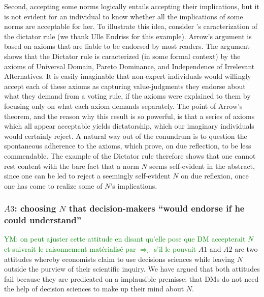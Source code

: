 \documentclass[preprint, french, english, 11pt, authoryear]{elsarticle}%
\newcommand{\protectforpdf}[1]{\texorpdfstring{\ensuremath{#1}}{#1}}
\newcommand{\commentYM}[1]{\textcolor{green}{YM: #1}}
\begin{document}
Second, accepting some norms logically entails accepting their implications, but it is not evident for an individual to know whether all the implications of some norms are acceptable for her. To illustrate this idea, consider \citeauthor{arrow_social_2012}’s \citeyearpar{arrow_social_2012} caracterization of the dictator rule (we thank Ulle Endriss for this example). Arrow's argument is based on axioms that are liable to be endorsed by most readers. The argument shows that the Dictator rule is caracterized (in some formal context) by the axioms of Universal Domain, Pareto Dominance, and Independence of Irrelevant Alternatives. It is easily imaginable that non-expert individuals would willingly accept each of these axioms as capturing value-judgments they endorse about what they demand from a voting rule, if the axioms were explained to them by focusing only on what each axiom demands separately. The point of Arrow's theorem, and the reason why this result is so powerful, is that a series of axioms which all appear acceptable yields dictatorship, which our imaginary individuals would certainly reject. A natural way out of the conundrum is to question the spontaneous adherence to the axioms, which prove, on due reflection, to be less commendable. The example of the Dictator rule therefore shows that one cannot rest content with the bare fact that a norm $N$ seems self-evident in the abstract, since one can be led to reject a seemingly self-evident $N$ on due reflexion, once one has come to realize some of $N$'s implications.

\subsubsection{\protectforpdf{A3}: choosing \protectforpdf{N} that decision-makers “would endorse if he could understand”}\commentYM{on peut ajuster cette attitude en disant qu'elle pose que DM accepterait $N$ et suivrait le raisonnement matérialisé par $⇒_c$ s'il le pouvait}
$A1$ and $A2$ are two attitudes whereby economists claim to use decisions sciences while leaving $N$ outside the purview of their scientific inquiry. We have argued that both attitudes fail because they are predicated on a implausible premisse: that \acp{DM} do not need the help of decision sciences to make up their mind about $N$.
\end{document}
